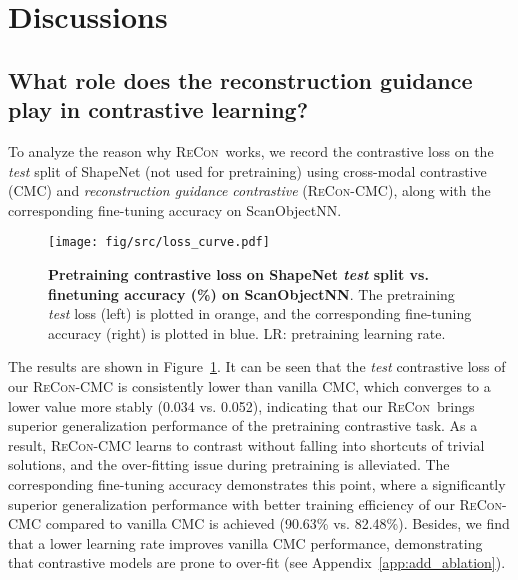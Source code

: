 \documentclass{article}
\theoremstyle{plain}
\theoremstyle{definition}
\theoremstyle{remark}
\def\recon{{\scshape ReCon}}
\begin{document}
 \section{Discussions}\label{Discuss}
\subsection{What role does the reconstruction guidance play in contrastive learning?}
\vspace{-6pt}
To analyze the reason why \recon\ works, we record the contrastive loss on the \textit{test} split of ShapeNet (not used for pretraining) using cross-modal contrastive (CMC) and \textit{reconstruction guidance contrastive} (\recon-CMC), along with the corresponding fine-tuning accuracy on ScanObjectNN. 
\begin{figure}[t!]
    \begin{center}
    \texttt{[image: fig/src/loss\_curve.pdf]}
    \vspace{-10pt}
    \caption{\textbf{Pretraining contrastive loss on ShapeNet \textit{test} split vs. finetuning accuracy (\%) on ScanObjectNN}. The pretraining \textit{test} loss (left) is plotted in orange, and the corresponding fine-tuning accuracy (right) is plotted in blue. LR: pretraining learning rate.
    }\label{fig:loss_curve}
    \vspace{-18pt}
    \end{center}
\end{figure} The results are shown in Figure~\ref{fig:loss_curve}. 
It can be seen that the \textit{test} contrastive loss of our \recon-CMC is consistently lower than vanilla CMC, which converges to a lower value more stably (0.034 vs. 0.052), indicating that our \recon~brings superior generalization performance of the pretraining contrastive task. 
As a result, \recon-CMC learns to contrast without falling into shortcuts of trivial solutions, and the over-fitting issue during pretraining is alleviated.
The corresponding fine-tuning accuracy demonstrates this point, where a significantly superior generalization performance with better training efficiency of our \recon-CMC compared to vanilla CMC is achieved (90.63\% vs. 82.48\%).
Besides, we find that a lower learning rate improves vanilla CMC performance, demonstrating that contrastive models are prone to over-fit (see Appendix~\ref{app:add_ablation}).
\end{document}
